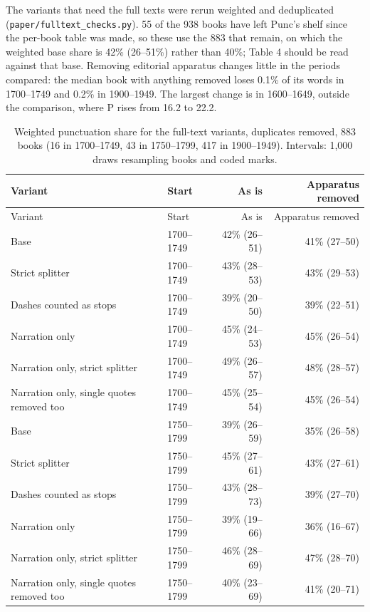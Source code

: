 \documentclass[
  11pt,
]{article}
\begin{document}
The variants that need the full texts were rerun weighted and deduplicated (\texttt{paper/fulltext\_checks.py}). 55 of the 938 books have left Punc's shelf since the per-book table was made, so these
use the 883 that remain, on which the weighted base share is 42\% (26--51\%) rather than 40\%; Table 4 should be read against that base. Removing editorial apparatus changes little in the periods
compared: the median book with anything removed loses 0.1\% of its words in 1700--1749 and 0.2\% in 1900--1949. The largest change is in 1600--1649, outside the comparison, where P rises from 16.2 to
22.2.


\begin{longtable}[]{@{}llrr@{}}
\caption{Weighted punctuation share for the full-text variants, duplicates removed, 883 books (16 in 1700--1749, 43 in 1750--1799, 417 in 1900--1949). Intervals: 1,000 draws resampling books and coded
marks.}\tabularnewline
\toprule\noalign{}
Variant & Start & As is & Apparatus removed \\
\midrule\noalign{}
\endfirsthead
\toprule\noalign{}
Variant & Start & As is & Apparatus removed \\
\midrule\noalign{}
\endhead
\bottomrule\noalign{}
\endlastfoot
Base & 1700--1749 & 42\% (26--51) & 41\% (27--50) \\
Strict splitter & 1700--1749 & 43\% (28--53) & 43\% (29--53) \\
Dashes counted as stops & 1700--1749 & 39\% (20--50) & 39\% (22--51) \\
Narration only & 1700--1749 & 45\% (24--53) & 45\% (26--54) \\
Narration only, strict splitter & 1700--1749 & 49\% (26--57) & 48\% (28--57) \\
Narration only, single quotes removed too & 1700--1749 & 45\% (25--54) & 45\% (26--54) \\
Base & 1750--1799 & 39\% (26--59) & 35\% (26--58) \\
Strict splitter & 1750--1799 & 45\% (27--61) & 43\% (27--61) \\
Dashes counted as stops & 1750--1799 & 43\% (28--73) & 39\% (27--70) \\
Narration only & 1750--1799 & 39\% (19--66) & 36\% (16--67) \\
Narration only, strict splitter & 1750--1799 & 46\% (28--69) & 47\% (28--70) \\
Narration only, single quotes removed too & 1750--1799 & 40\% (23--69) & 41\% (20--71) \\
\end{longtable}
\end{document}
